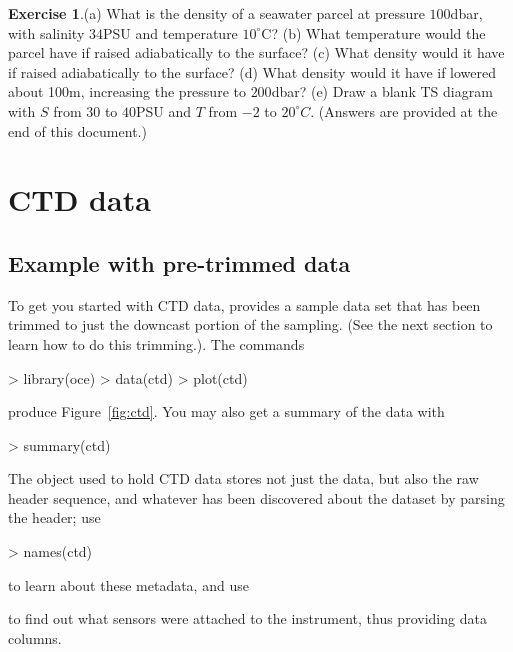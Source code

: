 \documentclass{article}
\newcommand{\workedexercise}[2]{
	\vspace{2ex plus 2ex minus 1ex}
	\begin{boxedminipage}[c]{0.95\linewidth}
		{\textbf{Exercise #1}.\hspace{1em}#2}
	\end{boxedminipage}
	\vspace{2ex plus 2ex minus 1ex}
}
\begin{document}
\workedexercise{1}{(a) What is the density of a seawater parcel at pressure
$100$dbar, with salinity $34$PSU and temperature $10^\circ$C?
(b) What temperature would the parcel have if raised adiabatically to the surface?
(c) What density would it have if raised adiabatically to the surface?
(d) What density would it have if lowered about 100m, increasing the pressure to $200$dbar?
(e) Draw a blank TS diagram with $S$ from $30$ to $40$PSU and $T$ from $-2$ to $20^\circ C$.  (Answers are provided at the end of this document.)
}


\section{CTD data}
\subsection{Example with pre-trimmed data}


To get you started with CTD data, \verb@oce@ provides a sample data set that has
been trimmed to just the downcast portion of the sampling.  (See the next
section to learn how to do this trimming.).  The commands
\begin{Schunk}
\begin{Sinput}
> library(oce)
> data(ctd)
> plot(ctd)
\end{Sinput}
\end{Schunk}
produce Figure~\ref{fig:ctd}. You may also get a summary of the data with
\begin{Schunk}
\begin{Sinput}
> summary(ctd)
\end{Sinput}
\end{Schunk}

The object used to hold CTD data stores not just the data, but also the raw
header sequence, and whatever has been discovered about the dataset by parsing
the header; use
\begin{Schunk}
\begin{Sinput}
> names(ctd)
\end{Sinput}
\end{Schunk}
to learn about these metadata, and use
\begin{Schunk}
\end{Schunk}
to find out what sensors were attached to the instrument, thus providing data columns.
\end{document}
